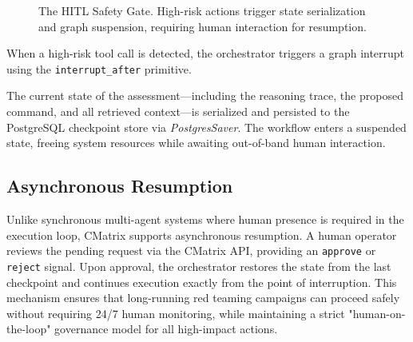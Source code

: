 \documentclass[conference,compsoc]{IEEEtran}
\begin{document}
\begin{figure}[htbp]
\centering
{}
\caption{The HITL Safety Gate. High-risk actions trigger state serialization and graph suspension, requiring human interaction for resumption.}
\label{fig:hitl}
\end{figure}

When a high-risk tool call is detected, the orchestrator triggers a graph interrupt using the \texttt{interrupt\_after} primitive.

The current state of the assessment---including the reasoning trace, the proposed command, and all retrieved context---is serialized and persisted to the PostgreSQL checkpoint store via \textit{PostgresSaver}. The workflow enters a suspended state, freeing system resources while awaiting out-of-band human interaction.

\subsection{Asynchronous Resumption}
Unlike synchronous multi-agent systems where human presence is required in the execution loop, CMatrix supports asynchronous resumption. A human operator reviews the pending request via the CMatrix API, providing an \texttt{approve} or \texttt{reject} signal. Upon approval, the orchestrator restores the state from the last checkpoint and continues execution exactly from the point of interruption. This mechanism ensures that long-running red teaming campaigns can proceed safely without requiring 24/7 human monitoring, while maintaining a strict "human-on-the-loop" governance model for all high-impact actions.
\end{document}
